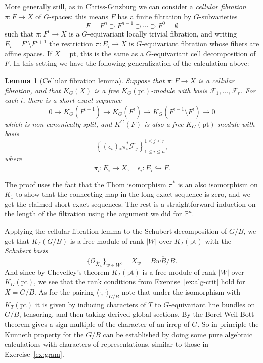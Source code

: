 \documentclass[11pt]{amsart}
\newtheorem{lemma}[dummy]{Lemma}
\theoremstyle{definition}
\newcommand{\bP}{\mathbb{P}}
\newcommand{\Fc}{\mathcal{F}}
\newcommand{\Oc}{\mathcal{O}}
\numberwithin{equation}{subsection}
\numberwithin{figure}{subsection}
\newcommand{\pt}{\mathrm{pt}}
\begin{document}
More generally still, as in Chriss-Ginzburg we can consider a \emph{cellular fibration} $\pi:F\rightarrow X$ of $G$-spaces: this means $F$ has a finite filtration by $G$-subvarieties
$$
F=F^n\supset F^{n-1}\supset\cdots\supset F^0=\emptyset
$$
such that $\pi:F^i\rightarrow X$ is a $G$-equivariant locally trivial fibration, and writing $E_i=F^i\setminus F^{i+1}$ the restriction $\pi:E_i\rightarrow X$ is $G$-equivariant fibration whose fibers are affine spaces. If $X=\pt$, this is the same as a $G$-equivariant cell decomposition of $F$. In this setting we have the following generalization of the calculation above:
\begin{lemma}[Cellular fibration lemma]
Suppose that $\pi:F\rightarrow X$ is a cellular fibration, and that $K_G(X)$ is a free $K_G(\pt)$-module with basis $\Fc_1,\ldots, \Fc_r$. For each $i$, there is a short exact sequence
$$
0\rightarrow K_G(F^{i-1})\rightarrow K_G(F^{i})\rightarrow K_G(F^{i-1}\setminus F^i)\rightarrow 0
$$
which is non-canonically split, and $K^G(F)$ is also a free $K_G(\pt)$-module with basis
$$
\left\{(\epsilon_i)_*\overline{\pi}_i^*\mathcal{F}_j\right\}_{1\leq i\leq n}^{1\leq j\leq r},
$$
where 
$$
\overline\pi_i: \overline{E}_i\rightarrow X,\quad \epsilon_i:\overline{E}_i\hookrightarrow F.
$$
\end{lemma}
The proof uses the fact that the Thom isomorphism $\pi^*$ is an also isomorphism on $K_1$ to show that the connecting map in the long exact sequence is zero, and we get the claimed short exact sequences. The rest is a straightforward induction on the length of the filtration using the argument we did for $\bP^n$.

Applying the cellular fibration lemma to the Schubert decomposition of $G/B$, we get that $K_T(G/B)$ is a free module of rank $|W|$ over $K_T(\pt)$ with the \emph{Schubert basis}
$$
\{\Oc_{\overline X_w}\}_{w\in W}, \quad \overline X_w = \overline{BwB/B}.
$$
And since by Chevelley's theorem $K_T(\pt)$ is a free module of rank $|W|$ over $K_G(\pt)$, we see that the rank conditions from Exercise~\ref{ex:alg-crit} hold for $X=G/B$. As for the pairing $\langle \cdot,\cdot\rangle_{G/B}$ note that under the isomorphism with $K_T(\pt)$ it is given by inducing characters of $T$ to $G$-equivariant line bundles on $G/B$, tensoring, and then taking derived global sections. By the Borel-Weil-Bott theorem gives a sign multiple of the character of an irrep of $G$. So in principle the Kunneth property for the $G/B$ can be established by doing some pure algebraic calculations with characters of representations, similar to those in Exercise~\ref{ex:gram}.
\end{document}
